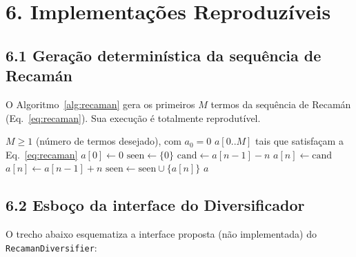 \documentclass[
	article,
	11pt,
	oneside,
	a4paper,
	english,
	brazil,
	sumario=tradicional
	]{abntex2}
\begin{document}
\section*{6. Implementações Reproduzíveis}

\subsection*{6.1 Geração determinística da sequência de Recamán}

O Algoritmo~\ref{alg:recaman} gera os primeiros $M$ termos da sequência de
Recamán (Eq.~\ref{eq:recaman}). Sua execução é totalmente reprodutível.

\begin{algorithm}[!htb]
\caption{Geração determinística da sequência de Recamán}
\label{alg:recaman}
\begin{algorithmic}[1]
\Require $M \geq 1$ (número de termos desejado), com $a_0 = 0$
\Ensure $a[0..M]$ tais que satisfaçam a Eq.~\ref{eq:recaman}
\State $a[0] \gets 0$
\State $\text{seen} \gets \{0\}$
  \State $\text{cand} \gets a[n-1] - n$
    \State $a[n] \gets \text{cand}$
  \Else
    \State $a[n] \gets a[n-1] + n$
  \EndIf
  \State $\text{seen} \gets \text{seen} \cup \{a[n]\}$
\EndFor
\State \Return $a$
\end{algorithmic}
\end{algorithm}

\subsection*{6.2 Esboço da interface do Diversificador}

O trecho abaixo esquematiza a interface proposta (não implementada) do
\texttt{RecamanDiversifier}:
\end{document}
